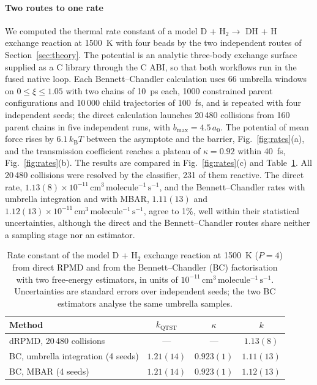 \documentclass[preprint,12pt]{elsarticle}
\newcommand{\kB}{k_{\mathrm{B}}}
\newcommand{\rateunit}{\mathrm{cm^{3}\,molecule^{-1}\,s^{-1}}}
\begin{document}
\paragraph{Two routes to one rate} We computed the thermal rate constant of a model D + H$_2\to$ DH + H exchange reaction at 1500~K with four beads by the two independent routes of Section~\ref{sec:theory}. The potential is an analytic three-body exchange surface supplied as a C library through the C ABI, so that both workflows run in the fused native loop. Each Bennett--Chandler calculation uses 66 umbrella windows on $0\le\xi\le1.05$ with two chains of 10~ps each, 1000 constrained parent configurations and 10\,000 child trajectories of 100~fs, and is repeated with four independent seeds; the direct calculation launches 20\,480 collisions from 160 parent chains in five independent runs, with $b_{\max}=4.5\,a_0$. The potential of mean force rises by $6.1\,\kB T$ between the asymptote and the barrier, Fig.~\ref{fig:rates}(a), and the transmission coefficient reaches a plateau of $\kappa=0.92$ within 40~fs, Fig.~\ref{fig:rates}(b). The results are compared in Fig.~\ref{fig:rates}(c) and Table~\ref{tab:exchange}. All 20\,480 collisions were resolved by the classifier, 231 of them reactive. The direct rate, $1.13(8)\times10^{-11}\,\rateunit$, and the Bennett--Chandler rates with umbrella integration and with MBAR, $1.11(13)$ and $1.12(13)\times10^{-11}\,\rateunit$, agree to 1\%, well within their statistical uncertainties, although the direct and the Bennett--Chandler routes share neither a sampling stage nor an estimator.

\begin{table}[!htbp]
\caption{Rate constant of the model D + H$_2$ exchange reaction at 1500~K ($P=4$) from direct RPMD and from the Bennett--Chandler (BC) factorisation with two free-energy estimators, in units of $10^{-11}\,\rateunit$. Uncertainties are standard errors over independent seeds; the two BC estimators analyse the same umbrella samples.}
\label{tab:exchange}
\small
\begin{tabular*}{\textwidth}{@{\extracolsep{\fill}}lccc@{}}
\toprule
Method & $k_{\mathrm{QTST}}$ & $\kappa$ & $k$ \\
\midrule
dRPMD, 20\,480 collisions & --- & --- & $1.13(8)$ \\
BC, umbrella integration (4 seeds) & $1.21(14)$ & $0.923(1)$ & $1.11(13)$ \\
BC, MBAR (4 seeds) & $1.21(14)$ & $0.923(1)$ & $1.12(13)$ \\
\bottomrule
\end{tabular*}
\end{table}
\end{document}
